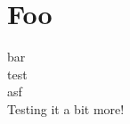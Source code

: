\documentclass[12pt]{article}
\begin{document}
\section{Foo}
bar\\
test\\
asf\\
Testing it a bit more!
\end{document}
